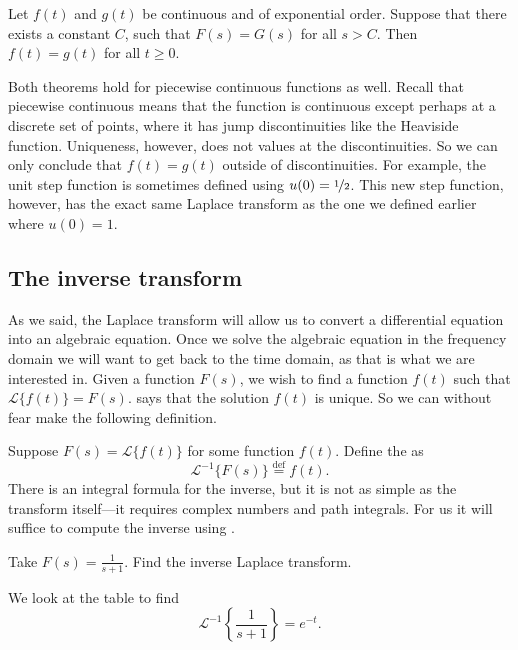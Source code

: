 \begin{theorem}[Uniqueness] \label{lt:uniqthm}
Let $f(t)$ and $g(t)$ be continuous and of exponential order.
Suppose that there exists a constant $C$,
such that $F(s) = G(s)$ for all $s > C$.
Then $f(t) = g(t)$ for all $t \geq 0$.
\end{theorem}

Both theorems hold for piecewise continuous functions as well.
Recall that piecewise continuous means that the function
is continuous except perhaps at a discrete set of points, where it has jump
discontinuities like the Heaviside function.  Uniqueness, however, does
not  values at the discontinuities.  So we can only conclude that
$f(t) = g(t)$ outside of discontinuities.  For example, the unit step
function is sometimes defined using $u(0) = \nicefrac{1}{2}$.  This new
step function, however, has the exact same Laplace transform
as the one we defined earlier where $u(0) = 1$.

\subsection{The inverse transform}

As we said, the Laplace transform will allow us to convert a differential
equation into an algebraic equation.  Once we solve the
algebraic equation in the frequency domain we will want to get back to the
time domain, as that is what we are interested in.
Given a function
$F(s)$, we wish to find a function
$f(t)$ such that $\mathcal{L} \bigl\{ f(t) \bigr\} = F(s)$.
 says that the solution $f(t)$ is unique.
So we can without fear make the following definition.

Suppose $F(s) = \mathcal{L} \bigl\{ f(t) \bigr\}$ for some function $f(t)$.
Define the
\emph{} as
\begin{equation*}
{\mathcal{L}}^{-1} \bigl\{ F(s) \bigr\} \overset{\text{def}}{=} f(t) .
\end{equation*}
There is an integral formula for the inverse, but it is not as simple
as the transform itself---it requires complex numbers and path integrals.
For us it will
suffice to
compute the inverse using .

\begin{example}
Take
$F(s) = \frac{1}{s+1}$.  Find the inverse Laplace transform.

We look at the table to find
\begin{equation*}
{\mathcal{L}}^{-1} \left\{ \frac{1}{s+1} \right\} = 
e^{-t} .
\end{equation*}
\end{example}

